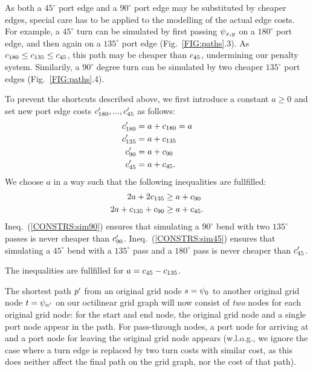 \documentclass{sig-alternate-sigmod09}
\begin{document}
%
As both a $45^{\circ}$ port edge and a $90^{\circ}$ port edge may be substituted by cheaper edges, special care has to be applied to the modelling of the actual edge costs.
For example, a $45^{\circ}$ turn can be simulated by first passing $\psi_{x, y}$ on a $180^{\circ}$ port edge, and then again on a $135^{\circ}$ port edge (Fig.~\ref{FIG:paths}.3).
As $c_{180} \leq c_{135} \leq c_{45}$, this path may be cheaper than $c_{45}$, undermining our penalty system. 
Similarily, a $90^{\circ}$ degree turn can be simulated by two cheaper $135^{\circ}$ port edges (Fig.~\ref{FIG:paths}.4).

To prevent the shortcuts described above, we first introduce a constant $a \geq 0$ and set new port edge costs $c'_{180}, ..., c'_{45}$ as follows:
%
\begin{align}
	c'_{180} &= a + c_{180} = a \\
	c'_{135} &= a + c_{135} \\
	c'_{90} &= a + c_{90} \\
	c'_{45} &= a + c_{45}.
\end{align}
%
We choose $a$ in a way such that the following inequalities are fullfilled:
%
\begin{align}
	2a + 2c_{135} &\geq a + c_{90} \label{CONSTRS:sim90}\\
	2a + c_{135} + c_{90} &\geq a + c_{45}\label{CONSTRS:sim45}.
\end{align}
Ineq.~(\ref{CONSTRS:sim90}) ensures that simulating a $90^{\circ}$ bend with two $135^{\circ}$ passes is never cheaper than $c'_{90}$.
Ineq.~(\ref{CONSTRS:sim45}) ensures that simulating a $45^{\circ}$ bend with a $135^{\circ}$ pass and a $180^{\circ}$ pass is never cheaper than $c'_{45}$.

The inequalities are fullfilled for $a = c_{45} - c_{135}$.

The shortest path $p'$ from an original grid node $s = \psi_0$ to another original grid node $t=\psi_{n'}$ on our octilinear grid graph will now consist of \emph{two} nodes for each original grid node: for the start and end node, the original grid node and a single port node appear in the path.
For pass-through nodes, a port node for arriving at and a port node for leaving the original grid node appears (w.l.o.g., we ignore the case where a turn edge is replaced by two turn costs with similar cost, as this does neither affect the final path on the grid graph, nor the cost of that path).
\end{document}
